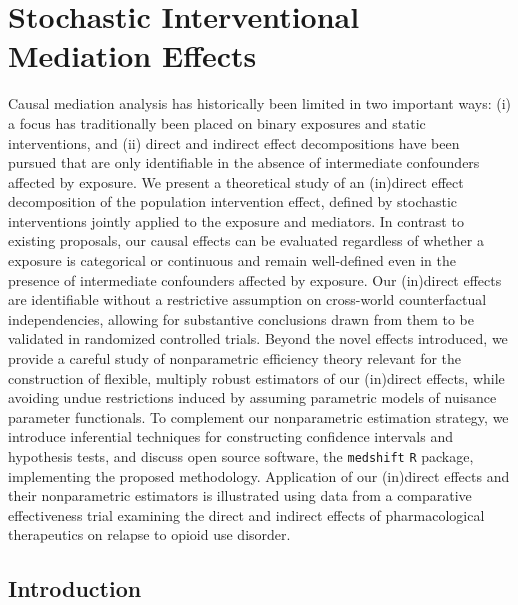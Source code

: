 \chapter{Stochastic Interventional Mediation Effects}

Causal mediation analysis has historically been limited in two important ways:
(i) a focus has traditionally been placed on binary exposures and static
interventions, and (ii) direct and indirect effect decompositions have been
pursued that are only identifiable in the absence of intermediate confounders
affected by exposure. We present a theoretical study of an (in)direct effect
decomposition of the population intervention effect, defined by stochastic
interventions jointly applied to the exposure and mediators. In contrast to
existing proposals, our causal effects can be evaluated regardless of whether
a exposure is categorical or continuous and remain well-defined even in the
presence of intermediate confounders affected by exposure. Our (in)direct
effects are identifiable without a restrictive assumption on cross-world
counterfactual independencies, allowing for substantive conclusions drawn from
them to be validated in randomized controlled trials. Beyond the novel effects
introduced, we provide a careful study of nonparametric efficiency theory
relevant for the construction of flexible, multiply robust estimators of our
(in)direct effects, while avoiding undue restrictions induced by assuming
parametric models of nuisance parameter functionals. To complement our
nonparametric estimation strategy, we introduce inferential techniques for
constructing confidence intervals and hypothesis tests, and discuss open source
software, the \texttt{medshift} \texttt{R} package, implementing the proposed
methodology. Application of our (in)direct effects and their nonparametric
estimators is illustrated using data from a comparative effectiveness trial
examining the direct and indirect effects of pharmacological therapeutics on
relapse to opioid use disorder.

\section{Introduction}\label{sec:intro}

